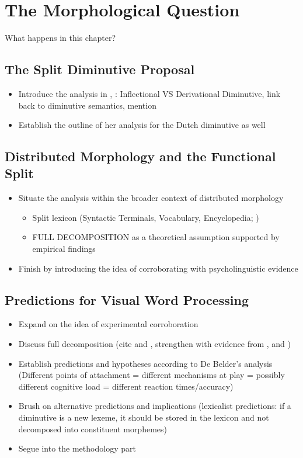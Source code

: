 \chapter{The Morphological Question}\label{chp:proposal}

What happens in this chapter? \par

\section{The Split Diminutive Proposal}
\begin{itemize}
    \item Introduce the analysis in \cite{DeBelder+etal+2014}, \cite{DeBelder+2011a}: Inflectional VS Derivational Diminutive, link back to diminutive semantics, mention \cite{Wiltschko+2006}
    \item Establish the outline of her analysis for the Dutch diminutive as well
\end{itemize}
\section{Distributed Morphology and the Functional Split}
\begin{itemize}
    \item Situate the analysis within the broader context of distributed morphology
    \begin{itemize}
        \item Split lexicon (Syntactic Terminals, Vocabulary, Encyclopedia; \cite{Embick+2015})
        \item FULL DECOMPOSITION as a theoretical assumption supported by empirical findings
    \end{itemize}
    \item Finish by introducing the idea of corroborating with psycholinguistic evidence
\end{itemize}
\section{Predictions for Visual Word Processing}
\begin{itemize}
    \item Expand on the idea of experimental corroboration
    \item Discuss full decomposition (cite \cite{Taft+1979} and \cite{Taft+2004}, strengthen with evidence from \cite{Fruchter+Marantz+2015}, \cite{Stockall+Marantz2006} and \cite{Fruchter+etal+2013})
    \item Establish predictions and hypotheses according to De Belder's analysis (Different points of attachment = different mechanisms at play = possibly different cognitive load = different reaction times/accuracy)
    \item Brush on alternative predictions and implications (lexicalist predictions: if a diminutive is a new lexeme, it should be stored in the lexicon and not decomposed into constituent morphemes)
    \item Segue into the methodology part
\end{itemize}

